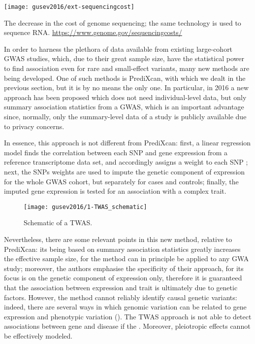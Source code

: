 \documentclass[../main.tex]{subfiles}
\begin{document}
\begin{marginfigure}[-13cm]
	\texttt{[image: gusev2016/ext-sequencingcost]}
	\caption[Sequencing cost over time]{The decrease in the cost of 
	genome sequencing; the same technology is used to sequence RNA. 
	\url{https://www.genome.gov/sequencingcosts/}}
\end{marginfigure}

In order to harness the plethora of data available from existing 
large-cohort GWAS studies, which, due to their great sample size, have 
the statistical power to find association even for rare and small-effect 
variants, many new methods are being developed. One of such methods is 
PrediXcan, with which we dealt in the previous section, but it is by no 
means the only one. In particular, in 2016 a new approach has been 
proposed which does not need individual-level data, but only summary 
association statistics from a GWAS, which is an important advantage since, 
normally, only the summary-level data of a study is publicly available 
due to privacy concerns.

In essence, this approach is not different from PrediXcan: first, a 
linear regression model finds the correlation between each SNP and gene 
expression from a reference transcriptome data set, and accordingly 
assigns a weight to each SNP ; next, the SNPs weights are 
used to impute the \cis genetic component of expression for the whole 
GWAS cohort, but separately for cases and controls; 
finally, the imputed gene expression is tested for an association 
 with a complex trait.

\begin{figure}
	\texttt{[image: gusev2016/1-TWAS\_schematic]}
	\caption{Schematic of a TWAS.}
\end{figure}

Nevertheless, there are some relevant points in this new method, 
relative to PrediXcan: its being based on summary association statistics 
greatly increases the effective sample size, for the method can in 
principle be applied to any GWA study; moreover, the authors emphasise 
the specificity of their approach, for its focus is on the genetic 
component of expression only, therefore it is guaranteed that the 
association between expression and trait is ultimately due to genetic 
factors. However, the method cannot reliably identify causal genetic 
variants: indeed, there are several ways in which genomic variation can 
be related to gene expression and phenotypic variation 
(). The TWAS approach is not able to detect 
associations between gene and disease if the . Moreover, pleiotropic 
effects cannot be effectively modeled.
\end{document}
